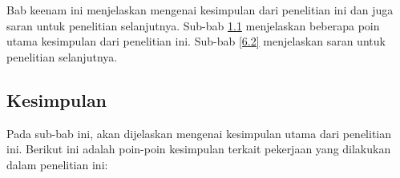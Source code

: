 \chapter{\kesimpulan}
\label{bab:6}
Bab keenam ini menjelaskan mengenai kesimpulan dari penelitian ini dan juga saran untuk penelitian selanjutnya. Sub-bab \ref{6.1} menjelaskan beberapa poin utama kesimpulan dari penelitian ini. Sub-bab \ref{6.2} menjelaskan saran untuk penelitian selanjutnya.

\section{Kesimpulan}
\label{6.1}
Pada sub-bab ini, akan dijelaskan mengenai kesimpulan utama dari penelitian ini. Berikut ini adalah poin-poin kesimpulan terkait pekerjaan yang dilakukan dalam penelitian ini:

